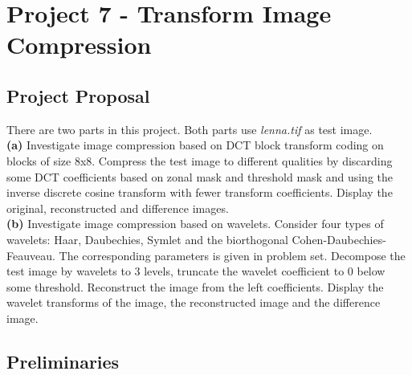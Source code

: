 \section{Project 7 - Transform Image Compression}
\subsection{Project Proposal}
There are two parts in this project. Both parts use \emph{lenna.tif} as test image.\\
\textbf{(a)} Investigate image compression based on DCT block transform coding on blocks of size 8x8. Compress the test image to different qualities by discarding some DCT coefficients based on zonal mask and threshold mask and using the inverse discrete cosine transform with fewer transform coefficients. Display the original, reconstructed and difference images. \\
\textbf{(b)} Investigate image compression based on wavelets. Consider four types of wavelets: Haar, Daubechies, Symlet and the biorthogonal Cohen-Daubechies-Feauveau. The corresponding parameters is given in problem set. Decompose the test image by wavelets to 3 levels, truncate the wavelet coefficient to 0 below some threshold. Reconstruct the image from the left coefficients. Display the wavelet transforms of the image, the reconstructed image and the difference image.

\subsection{Preliminaries}
